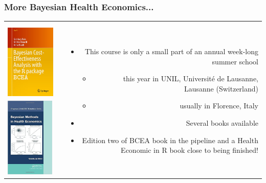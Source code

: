 \begin{frame}%
\frametitle{More Bayesian Health Economics...}

\begin{tabular}{lcr}
\begin{minipage}[l]{5.0cm}
\textbf{Books}\\
\includegraphics[height=3.8cm]{bcea_book}
\includegraphics[height=3.8cm]{bmhe_book}
\end{minipage} & &
\begin{minipage}[r]{6.5cm}
\begin{itemize}
\item This course is only a small part of an \alert{annual week-long summer school}
\begin{itemize}
\item this year in  UNIL, Université de Lausanne, Lausanne (Switzerland)
\item usually in Florence, Italy
\end{itemize}
\item Several books available
\item Edition two of BCEA book in the pipeline and a Health Economic in R book close to being finished!
\end{itemize}

\end{minipage}
\end{tabular}
\end{frame}

